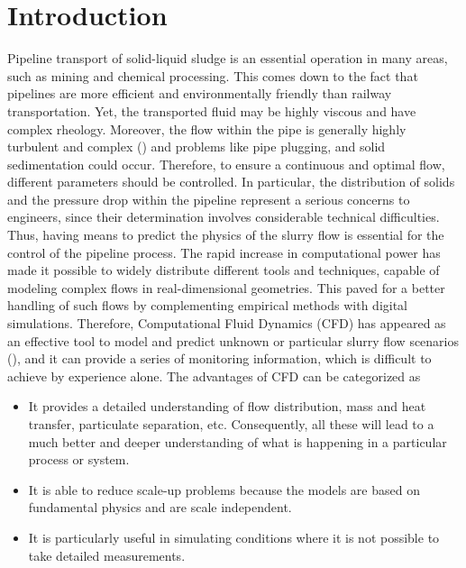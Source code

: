 \documentclass[11pt]{report}
\begin{document}
\maketitle
\tableofcontents
\renewcommand{\thepage}{\arabic{page}}
\chapter{Introduction}
\label{chap:intro}
Pipeline transport of solid-liquid sludge is an essential operation in many areas, such as mining and chemical processing.
%
This comes down to the fact that pipelines are more efficient and environmentally friendly than railway transportation.
%
Yet, the transported fluid may be highly viscous and have complex rheology.
%
Moreover, the flow within the pipe is  generally highly turbulent and complex (\citet{Lahiri-2010}) and problems like pipe plugging, and solid sedimentation could occur.
%
Therefore, to ensure a continuous and optimal flow, different parameters should be controlled.
%
In particular, the distribution of solids and the pressure drop within the pipeline represent a serious concerns to engineers, since their determination involves considerable technical difficulties.
%
Thus, having means to predict the physics of the slurry flow is essential for the control of the pipeline process.
%
The rapid increase in computational power has made it possible to widely distribute different tools and techniques, capable of modeling complex flows in real-dimensional geometries.
%
This paved for a better handling of such flows by complementing empirical methods with digital simulations.
%
Therefore, Computational Fluid Dynamics (CFD) has appeared as an effective tool to model and predict unknown or particular slurry flow scenarios (\citet{Bi-2002}), and it can provide a series of monitoring information, which is difficult to achieve by experience alone.
%
The advantages of CFD can be categorized as
%
\begin{itemize}
\item It provides a detailed understanding of flow distribution, mass and heat transfer, particulate separation, etc.
%
Consequently, all these will lead to a much better and deeper understanding of what is happening in a particular process or system.
%
\item It is able to reduce scale-up problems because the models are based on fundamental physics and are scale independent.
%
\item It is particularly useful in simulating conditions where it is not possible to take detailed measurements.
\end{itemize}
\end{document}
